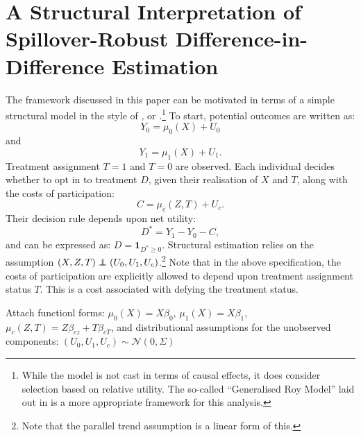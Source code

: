 \section{A Structural Interpretation of Spillover-Robust Difference-in-Difference Estimation}
The framework discussed in this paper can be motivated in terms of a simple
structural model in the style of \citet{Roy1951}, or 
\citet{HeckmanVytlacil2005}.\footnote{While the \citet{Roy1951} model is not
cast in terms of causal effects, it does consider selection based on relative
utility.  The so-called ``Generalised Roy Model'' laid out in 
\citet{HeckmanVytlacil2005} is a more appropriate framework for this analysis.}
To start, potential outcomes are written as:
\[
Y_0= \mu_0(X) + U_0
\]
and
\[
Y_1= \mu_1(X) + U_1.
\]
Treatment assignment $T=1$ and $T=0$ are observed.  Each individual decides
whether to opt in to treatment $D$, given their realisation of $X$ and $T$,
along with the costs of participation:
\[
C=\mu_c(Z,T)+U_c.
\]
Their decision rule depends upon net utility:
\[
D^{*}=Y_1-Y_0-C,
\]
and can be expressed as: $D=\mathbf{1}_{D^{*}\geq 0}$.  Structural estimation
relies on the assumption $(X,Z,T) \independent (U_0,U_1,U_c)$.\footnote{Note
that the parallel trend assumption is a linear form of this.}  Note that in 
the above specification, the costs of participation are explicitly allowed 
to depend upon treatment assignment status $T$. This is a cost associated with
defying the treatment status.

Attach functionl forms: $\mu_0(X)=X\beta_0$, $\mu_1(X)=X\beta_1$, 
$\mu_c(Z,T)=Z\beta_{cz}+T\beta_{cT}$, and distributional assumptions for the
unobserved components: $(U_0,U_1,U_c)\sim \mathcal{N}(0,\Sigma)$ 



%
